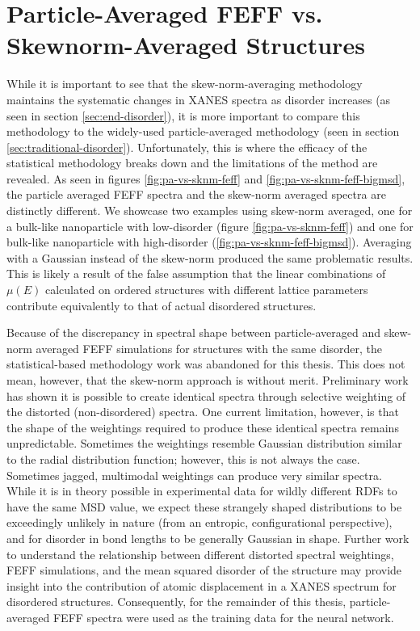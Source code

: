 \section{Particle-Averaged FEFF vs. Skewnorm-Averaged Structures} \label{sec:pa-feff-vs-gaussian-feff}

While it is important to see that the skew-norm-averaging methodology maintains the systematic changes in XANES spectra as disorder increases (as seen in section \ref{sec:end-disorder}), it is more important to compare this methodology to the widely-used particle-averaged methodology (seen in section \ref{sec:traditional-disorder}). Unfortunately, this is where the efficacy of the statistical methodology breaks down and the limitations of the method are revealed. As seen in figures \ref{fig:pa-vs-sknm-feff} and \ref{fig:pa-vs-sknm-feff-bigmsd}, the particle averaged FEFF spectra and the skew-norm averaged spectra are distinctly different. We showcase two examples using skew-norm averaged, one for a bulk-like nanoparticle with low-disorder (figure \ref{fig:pa-vs-sknm-feff}) and one for bulk-like nanoparticle with high-disorder (\ref{fig:pa-vs-sknm-feff-bigmsd}). Averaging with a Gaussian instead of the skew-norm produced the same problematic results. This is likely a result of the false assumption that the linear combinations of $ \mu(E) $ calculated on ordered structures with different lattice parameters contribute equivalently to that of actual disordered structures.

Because of the discrepancy in spectral shape between particle-averaged and skew-norm averaged FEFF simulations for structures with the same disorder, the statistical-based methodology work was abandoned for this thesis. This does not mean, however, that the skew-norm approach is without merit. Preliminary work has shown it is possible to create identical spectra through selective weighting of the distorted (non-disordered) spectra. One current limitation, however, is that the shape of the weightings required to produce these identical spectra remains unpredictable. Sometimes the weightings resemble Gaussian distribution similar to the radial distribution function; however, this is not always the case. Sometimes jagged, multimodal weightings can produce very similar spectra. While it is in theory possible in experimental data for wildly different RDFs to have the same MSD value, we expect these strangely shaped distributions to be exceedingly unlikely in nature (from an entropic, configurational perspective), and for disorder in bond lengths to be generally Gaussian in shape. Further work to understand the relationship between different distorted spectral weightings, FEFF simulations, and the mean squared disorder of the structure may provide insight into the contribution of atomic displacement in a XANES spectrum for disordered structures. Consequently, for the remainder of this thesis, particle-averaged FEFF spectra were used as the training data for the neural network.

